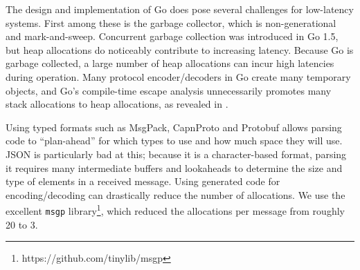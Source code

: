 The design and implementation of Go does pose several challenges for low-latency systems.
First among these is the garbage collector, which is non-generational and mark-and-sweep.
Concurrent garbage collection was introduced in Go 1.5, but heap allocations do noticeably contribute to increasing latency.
Because Go is garbage collected, a large number of heap allocations can incur high latencies during
operation.
Many protocol encoder/decoders in Go create many temporary objects, and Go's compile-time escape analysis unnecessarily promotes many stack allocations to heap allocations, as revealed
in \cite{goescape}.

Using typed formats such as MsgPack, CapnProto and Protobuf allows parsing code to ``plan-ahead'' for which types to use and how much space they will use.
JSON is particularly bad at this; because it is a character-based format, parsing it requires many intermediate buffers and lookaheads to determine the size and type of elements in a received message.
Using generated code for encoding/decoding can drastically reduce the number of allocations. We use the excellent \texttt{msgp} library\footnote{https://github.com/tinylib/msgp}, which reduced the allocations per message from roughly 20 to 3.




